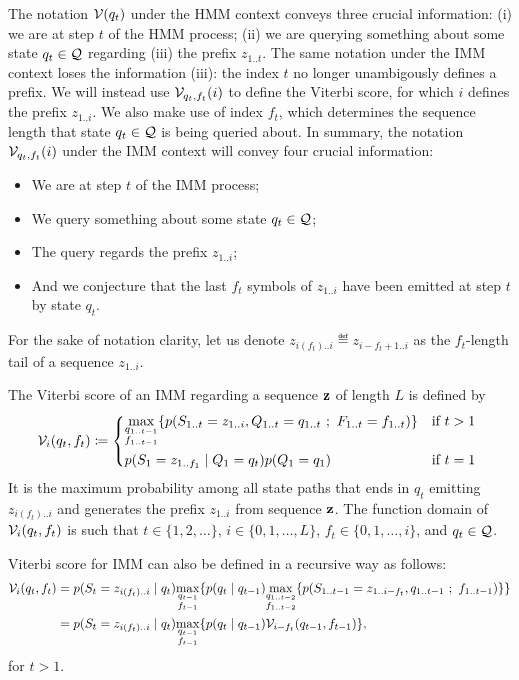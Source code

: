 The notation $\mathcal{V}(q_t)$ under the HMM context conveys three crucial information: (i) we are at
step $t$ of the HMM process; (ii) we are querying something about some state $q_t \in \mathcal{Q}$
regarding (iii) the prefix $z_{1..t}$. The same notation under the IMM context loses the information
(iii): the index $t$ no longer unambigously defines a prefix. We will instead use
$\mathcal{V}_{q_t,f_t}(i)$ to define the Viterbi score, for which $i$ defines the prefix $z_{1..i}$. We
also make use of index $f_t$, which determines the sequence length that state $q_t \in \mathcal{Q}$ is
being queried about.
In summary, the notation $\mathcal{V}_{q_t,f_t}(i)$ under the IMM context will convey four crucial
information:
\begin{itemize}
  \item We are at step $t$ of the IMM process;
  \item We query something about some state $q_t \in \mathcal{Q}$;
  \item The query regards the prefix $z_{1..i}$;
  \item And we conjecture that the last $f_t$ symbols of $z_{1..i}$ have been emitted at step $t$ by
    state $q_t$.
\end{itemize}
For the sake of notation clarity, let us denote $z_{i(f_t)..i} \eqdef z_{i-f_t+1..i}$ as the
$f_t$-length tail of a sequence $z_{1..i}$.

The Viterbi score of an IMM regarding a sequence $\mathbf{z}$ of length $L$ is defined by
\begin{equation*}
  \viterbi_{i}(q_t,f_t) \eqdef
  \begin{dcases*}
    \umax{\substack{q_{1..t-1}\\f_{1..t-1}}}
    \{
      p(S_{1..t}=z_{1..i}, Q_{1..t}=q_{1..t} ~;~ F_{1..t}=f_{1..t})
    \}                                                                  & if $t>1$\\
    p(S_1=z_{1..f_1} \gv Q_1=q_t) p(Q_1=q_1)                            & if $t=1$
  \end{dcases*}
\end{equation*}
It is the maximum probability among all state paths that ends in
$q_t$ emitting $z_{i(f_t)..i}$ and generates the prefix $z_{1..i}$ from sequence $\mathbf{z}$.
The function domain of $\mathcal{V}_{i}(q_t,f_t)$ is such that $t \in \{1, 2, \dots\}$, $i \in \{0, 1,
\dots, L\}$, $f_t \in \{0, 1, \dots, i\}$, and $q_t \in \mathcal{Q}$.

Viterbi score for IMM can also be defined in a recursive way as follows:
\begin{equation*}
  \begin{split}
    \mathcal{V}_{i}(q_t,f_t)
    &= p(S_t=z_{i(f_t)..i} \;|\; q_t)
      \underset{\substack{q_{t-1}\\f_{t-1}}}{\max}
      \{
        p(q_t \;|\; q_{t-1})
        \underset{\substack{q_{1..t-2}\\f_{1..t-2}}}{\max}
        \{
          p(S_{1..t-1}=z_{1..i-f_t}, q_{1..t-1} ~;~ f_{1..t-1})
        \}
      \}\\
    &= p(S_t=z_{i(f_t)..i} \;|\; q_t)
      \underset{\substack{q_{t-1}\\f_{t-1}}}{\max}
      \{
        p(q_t \;|\; q_{t-1}) \mathcal{V}_{i-f_t}(q_{t-1},f_{t-1})
      \},
  \end{split}
\end{equation*}
for $t>1$.


